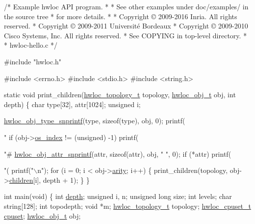 \begin{DoxyCodeInclude}
\textcolor{comment}{/* Example hwloc API program.}
\textcolor{comment}{ *}
\textcolor{comment}{ * See other examples under doc/examples/ in the source tree}
\textcolor{comment}{ * for more details.}
\textcolor{comment}{ *}
\textcolor{comment}{ * Copyright © 2009-2016 Inria.  All rights reserved.}
\textcolor{comment}{ * Copyright © 2009-2011 Université Bordeaux}
\textcolor{comment}{ * Copyright © 2009-2010 Cisco Systems, Inc.  All rights reserved.}
\textcolor{comment}{ * See COPYING in top-level directory.}
\textcolor{comment}{ *}
\textcolor{comment}{ * hwloc-hello.c}
\textcolor{comment}{ */}

\textcolor{preprocessor}{#include "hwloc.h"}

\textcolor{preprocessor}{#include <errno.h>}
\textcolor{preprocessor}{#include <stdio.h>}
\textcolor{preprocessor}{#include <string.h>}

\textcolor{keyword}{static} \textcolor{keywordtype}{void} print\_children(\hyperlink{a00186_ga9d1e76ee15a7dee158b786c30b6a6e38}{hwloc\_topology\_t} topology, 
      \hyperlink{a00238}{hwloc\_obj\_t} obj,
                           \textcolor{keywordtype}{int} depth)
\{
    \textcolor{keywordtype}{char} type[32], attr[1024];
    \textcolor{keywordtype}{unsigned} i;

    \hyperlink{a00188_gadb8765c260edea80c52cd06a76639ba4}{hwloc\_obj\_type\_snprintf}(type, \textcolor{keyword}{sizeof}(type), obj, 0);
    printf(\textcolor{stringliteral}{"%
    \textcolor{keywordflow}{if} (obj->\hyperlink{a00238_a61a7a80a68eaccbaaa28269e678c81a9}{os\_index} != (\textcolor{keywordtype}{unsigned}) -1)
      printf(\textcolor{stringliteral}{"#%
    \hyperlink{a00188_ga870e876931c282a1c7aee2f031912ce3}{hwloc\_obj\_attr\_snprintf}(attr, \textcolor{keyword}{sizeof}(attr), obj, \textcolor{stringliteral}{" "}, 0);
    \textcolor{keywordflow}{if} (*attr)
      printf(\textcolor{stringliteral}{"(%
    printf(\textcolor{stringliteral}{"\(\backslash\)n"});
    \textcolor{keywordflow}{for} (i = 0; i < obj->\hyperlink{a00238_aac3f6da35c9b57599909a44ce2b716c1}{arity}; i++) \{
        print\_children(topology, obj->\hyperlink{a00238_a04d05403da37bfe17cd63b7c7dd07b1f}{children}[i], depth + 1);
    \}
\}

\textcolor{keywordtype}{int} main(\textcolor{keywordtype}{void})
\{
    \textcolor{keywordtype}{int} \hyperlink{a00238_a4876fd165b4fff35521f07ebd85355ed}{depth};
    \textcolor{keywordtype}{unsigned} i, n;
    \textcolor{keywordtype}{unsigned} \textcolor{keywordtype}{long} size;
    \textcolor{keywordtype}{int} levels;
    \textcolor{keywordtype}{char} \textcolor{keywordtype}{string}[128];
    \textcolor{keywordtype}{int} topodepth;
    \textcolor{keywordtype}{void} *m;
    \hyperlink{a00186_ga9d1e76ee15a7dee158b786c30b6a6e38}{hwloc\_topology\_t} topology;
    \hyperlink{a00183_ga4bbf39b68b6f568fb92739e7c0ea7801}{hwloc\_cpuset\_t} \hyperlink{a00238_a67925e0f2c47f50408fbdb9bddd0790f}{cpuset};
    \hyperlink{a00238}{hwloc\_obj\_t} obj;

}}}
\end{DoxyCodeInclude}
